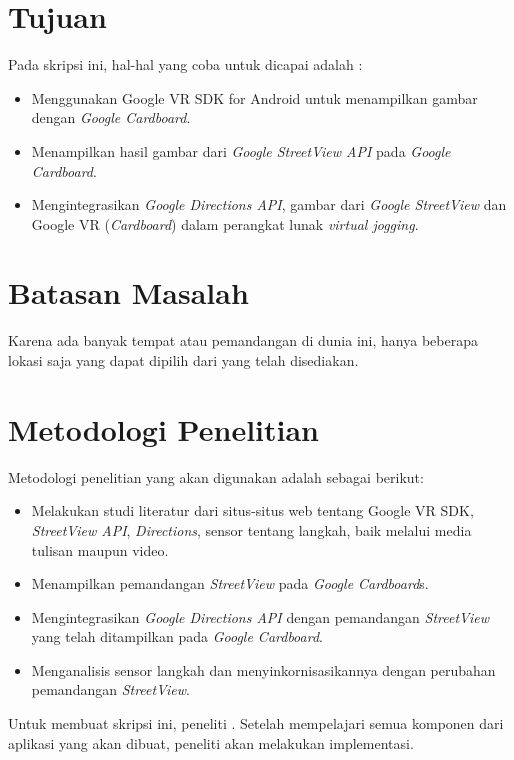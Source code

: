 
\section{Tujuan}
\label{sec:tujuan}
Pada skripsi ini, hal-hal yang coba untuk dicapai adalah :
\begin{itemize}
	\item Menggunakan Google VR SDK for Android untuk menampilkan gambar dengan {\it Google Cardboard}.
	\item Menampilkan hasil gambar dari \textit{Google StreetView API} pada {\it Google Cardboard}.
	\item Mengintegrasikan \textit{Google Directions API}, gambar dari \textit{Google StreetView} dan Google VR (\textit{Cardboard}) dalam perangkat lunak {\it virtual jogging}.
\end{itemize}


\section{Batasan Masalah}
\label{sec:batasan}
Karena ada banyak tempat atau pemandangan di dunia ini, hanya beberapa lokasi saja yang dapat dipilih dari yang telah disediakan.


\section{Metodologi Penelitian}
\label{sec:metlit}
Metodologi penelitian yang akan digunakan adalah sebagai berikut:
\begin{itemize}
	\item Melakukan studi literatur dari situs-situs web tentang Google VR SDK, \textit{StreetView API}, \textit{Directions}, sensor tentang langkah, baik melalui media tulisan maupun video.
	\item Menampilkan pemandangan {\it StreetView} pada {\it Google Cardboard}s.
	\item Mengintegrasikan {\it Google Directions API} dengan pemandangan {\it StreetView} yang telah ditampilkan pada {\it Google Cardboard}.
	\item Menganalisis sensor langkah dan menyinkornisasikannya dengan perubahan pemandangan \textit{StreetView}.
\end{itemize}
Untuk membuat skripsi ini, peneliti . Setelah mempelajari semua komponen dari aplikasi yang akan dibuat, peneliti akan melakukan implementasi. 

